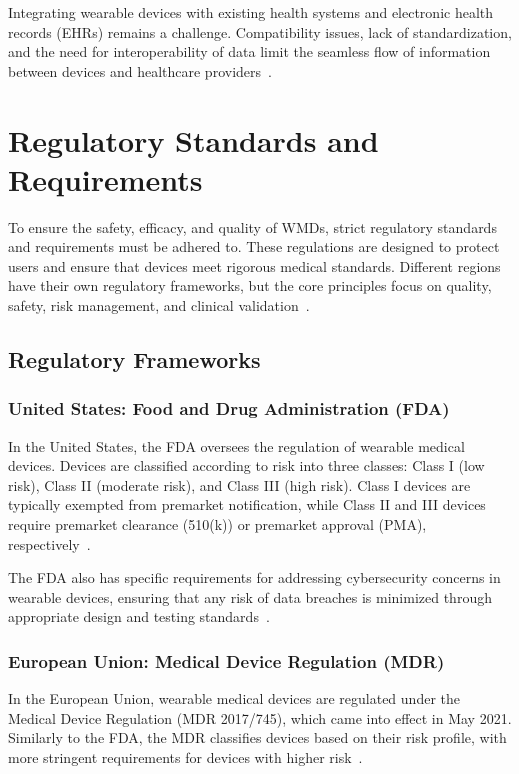 \documentclass[journal]{IEEEtran}
\begin{document}
        Integrating wearable devices with existing health systems and electronic health records (EHRs) remains a challenge. Compatibility issues, lack of standardization, and the need for interoperability of data limit the seamless flow of information between devices and healthcare providers~\cite{Ravizza2019}.

\section{Regulatory Standards and Requirements}
\label{8.Regulatory}
To ensure the safety, efficacy, and quality of WMDs, strict regulatory standards and requirements must be adhered to. These regulations are designed to protect users and ensure that devices meet rigorous medical standards. Different regions have their own regulatory frameworks, but the core principles focus on quality, safety, risk management, and clinical validation~\cite{Ravizza2019,EuropeanUnion2024,Dias2018}.

    \subsection{Regulatory Frameworks}

        \subsubsection{United States: Food and Drug Administration (FDA)}

        In the United States, the FDA oversees the regulation of wearable medical devices. Devices are classified according to risk into three classes: Class I (low risk), Class II (moderate risk), and Class III (high risk). Class I devices are typically exempted from premarket notification, while Class II and III devices require premarket clearance (510(k)) or premarket approval (PMA), respectively~\cite{Dias2018}.

        The FDA also has specific requirements for addressing cybersecurity concerns in wearable devices, ensuring that any risk of data breaches is minimized through appropriate design and testing standards~\cite{Ravizza2019,FDA2016,FDA2023}.

        \subsubsection{European Union: Medical Device Regulation (MDR)}

        In the European Union, wearable medical devices are regulated under the Medical Device Regulation (MDR 2017/745), which came into effect in May 2021. Similarly to the FDA, the MDR classifies devices based on their risk profile, with more stringent requirements for devices with higher risk~\cite{EuropeanUnion2024}.
\end{document}
